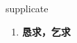 
\begin{frame}
{\huge supplicate}
\begin{center}
\begin{enumerate}\Large
  \item \textbf{恳求，乞求}
\end{enumerate}
\end{center}
\end{frame}
